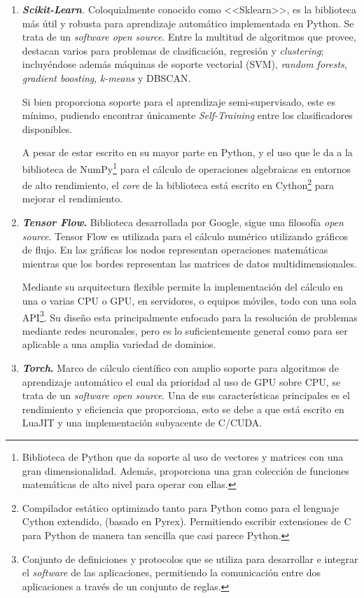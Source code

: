 \begin{enumerate}
\item \textit{\textbf{Scikit-Learn}.}
Coloquialmente conocido como <<Sklearn>>, es la biblioteca más útil y robusta para aprendizaje automático implementada en Python. Se trata de un \textit{software open source}. Entre la multitud de algoritmos que provee, destacan varios para problemas de clasificación, regresión y \textit{clustering}; incluyéndose además máquinas de soporte vectorial (SVM), \textit{random forests}, \textit{gradient boosting}, \textit{k-means} y DBSCAN.

Si bien proporciona soporte para el aprendizaje semi-supervisado, este es mínimo, pudiendo encontrar únicamente \textit{Self-Training} entre los clasificadores disponibles.

A pesar de estar escrito en su mayor parte en Python, y el uso que le da a la biblioteca de NumPy\footnote{Biblioteca de Python que da soporte al uso de vectores y matrices con una gran dimensionalidad. Además, proporciona una gran colección de funciones matemáticas de alto nivel para operar con ellas.} para el cálculo de operaciones algebraicas en entornos de alto rendimiento, el \textit{core} de la biblioteca está escrito en Cython\footnote{Compilador estático optimizado tanto para Python como para el lenguaje Cython extendido, (basado en Pyrex). Permitiendo escribir extensiones de C para Python de manera tan sencilla que casi parece Python.} para mejorar el rendimiento. 

\item \textbf{\textit{Tensor Flow}.}
Biblioteca desarrollada por Google, sigue una filosofía \textit{open source}. Tensor Flow es utilizada para el cálculo numérico utilizando gráficos de flujo. En las gráficas los nodos representan operaciones matemáticas mientras que los bordes representan las matrices de datos multidimensionales.

Mediante su arquitectura flexible permite la implementación del cálculo en una o varias CPU o GPU, en servidores, o equipos móviles, todo con una sola API\footnote{Conjunto de definiciones y protocolos que se utiliza para desarrollar e integrar el \textit{software} de  las aplicaciones, permitiendo la comunicación entre dos aplicaciones a través de un conjunto de reglas.}. Su diseño esta principalmente enfocado para la resolución de problemas mediante redes neuronales, pero es lo suficientemente general como para ser aplicable a una amplia variedad de dominios.

\item \textbf{\textit{Torch}.}
Marco de cálculo científico con amplio soporte para algoritmos de aprendizaje automático el cual da prioridad al uso de GPU sobre CPU, se trata de un \textit{software open source}. Una de sus características principales es el rendimiento y eficiencia que proporciona, esto se debe a que está escrito en LuaJIT y una implementación subyacente de C/CUDA.


\end{enumerate}
